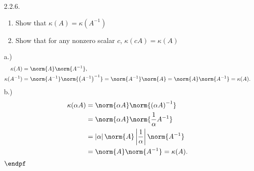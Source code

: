 \documentclass{report}
\begin{document}
    

    \bigbreak \noindent 
    \begin{mdframed}
        2.2.6.
        \begin{enumerate}[label=(\alph*)]
            \item Show that $\kappa(A) = \kappa(A^{-1})$
            \item Show that for any nonzero scalar $c$, $\kappa(cA) = \kappa(A)$
        \end{enumerate}
    \end{mdframed}
    \bigbreak \noindent 
    a.)
    \begin{align*}
        \kappa(A) &= \norm{A}\norm{A^{-1}}, \\
        \kappa(A^{-1}) &= \norm{A^{-1}}\norm{\left(A^{-1}\right)^{-1}} = \norm{A^{-1}}\norm{A} = \norm{A}\norm{A^{-1}} = \kappa(A)
    .\end{align*}
    b.) 
    \begin{align*}
        \kappa(\alpha A) &= \norm{\alpha A}\norm{\left(\alpha A\right)^{-1}} \\
                         &= \norm{\alpha A}\norm{\frac{1}{\alpha}A^{-1}} \\
                         &= \left\lvert \alpha \right\rvert \norm{A} \left\lvert \frac{1}{\alpha} \right\rvert\norm{A^{-1}} \\
                         &= \norm{A}\norm{A^{-1}} = \kappa(A)
    .\end{align*}
    $\endpf$
\end{document}
